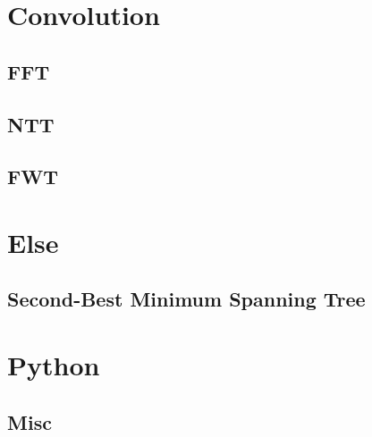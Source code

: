 \section{Convolution}
\subsection{FFT}

\subsection{NTT}

\subsection{FWT}


\section{Else}
\subsection{Second-Best Minimum Spanning Tree}

\section{Python}
\subsection{Misc}

